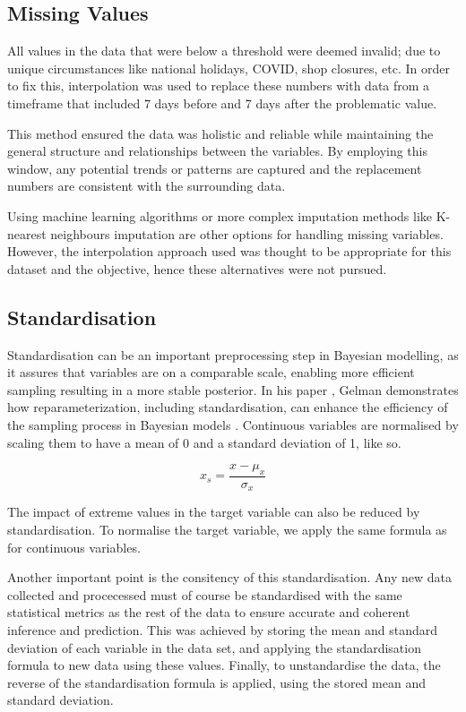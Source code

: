 \subsection{Missing Values}

All values in the data that were below a threshold were deemed invalid; due to
unique circumstances like national holidays, COVID, shop closures, etc. In
order to fix this, interpolation was used to replace these numbers with data
from a timeframe that included 7 days before and 7 days after the problematic
value.

This method ensured the data was holistic and reliable while maintaining the
general structure and relationships between the variables. By employing this
window, any potential trends or patterns are captured and the replacement
numbers are consistent with the surrounding data.

Using machine learning algorithms or more complex imputation methods like
K-nearest neighbours imputation are other options for handling missing
variables. However, the interpolation approach used was thought to be
appropriate for this dataset and the objective, hence these alternatives were
not pursued.


\subsection{Standardisation}

Standardisation can be an important preprocessing step in Bayesian modelling,
as it assures that variables are on a comparable scale, enabling more efficient
sampling resulting in a more stable posterior. \cite{gelman2013philosophy}
In his paper \cite{gelman2004parameterization}, Gelman demonstrates how
reparameterization, including standardisation, can enhance the efficiency of
the sampling process in Bayesian models \cite{gelman2004parameterization}.
Continuous variables are normalised by scaling them to have a mean of 0 and a
standard deviation of 1, like so.

\begin{equation}
  x_{s} = \frac{x - \mu_x}{\sigma_x}
\end{equation}

The impact of extreme values in the target variable can also be reduced by
standardisation. To normalise the target variable, we apply the same formula as
for continuous variables.

Another important point is the consitency of this standardisation. Any new data
collected and procecessed must of course be standardised with the same
statistical metrics as the rest of the data to ensure accurate and coherent
inference and prediction. This was achieved by storing the mean and standard 
deviation of each variable in the data set, and applying the standardisation 
formula to new data using these values. Finally, to unstandardise the data, the 
reverse of the standardisation formula is applied, using the stored mean and
standard deviation. 

